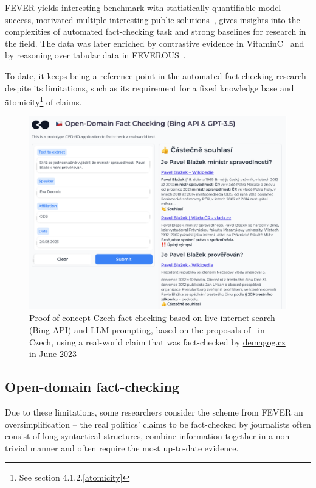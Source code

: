 FEVER yields interesting benchmark with statistically quantifiable model success, motivated multiple interesting public solutions~\cite{fever1,fever2}, gives insights into the complexities of automated fact-checking task and strong baselines for research in the field. The data was later enriched by contrastive evidence in VitaminC~\cite{DBLP:journals/corr/abs-2103-08541} and by reasoning over tabular data in FEVEROUS~\cite{aly2021feverous}.

To date, it keeps being a reference point in the automated fact checking research despite its limitations, such as its requirement for a fixed knowledge base and \"{atomicity}\footnote{See section 4.1.2.\ref{atomicity}} of claims.

\begin{figure}
    \includegraphics[width=14cm]{fig/bing.pdf}
    \caption{Proof-of-concept Czech fact-checking based on live-internet search (Bing API) and LLM prompting, based on the proposals of~\cite{bing} in Czech, using a real-world claim that was fact-checked by \href{https://demagog.cz/vyrok/22849}{\url{demagog.cz}} in June 2023}
    \label{fig:bing}
\end{figure}

\subsection{Open-domain fact-checking}
Due to these limitations, some researchers consider the scheme from FEVER an oversimplification -- the real politics' claims to be fact-checked by journalists often consist of long syntactical structures, combine information together in a non-trivial manner and often require the most up-to-date evidence. 

